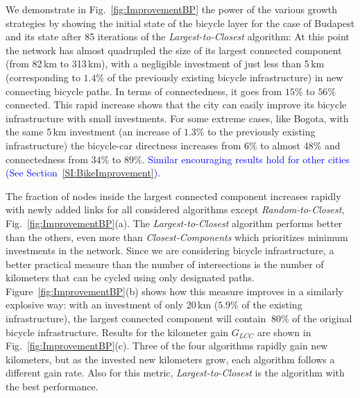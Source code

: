 We demonstrate in Fig.~\ref{fig:ImprovementBP} the power of the various growth strategies by showing the initial state of the bicycle layer for the case of Budapest and its state after 85 iterations of the \emph{Largest-to-Closest} algorithm: At this point the network has almost quadrupled the size of its largest connected component (from 82\,km to 313\,km), with a negligible investment of just less than 5\,km (corresponding to $1.4\%$ of the previously existing bicycle infrastructure) in new connecting bicycle paths. In terms of connectedness, it goes from $15\%$ to $56\%$ connected. This rapid increase shows that the city can easily improve its bicycle infrastructure with small investments. For some extreme cases, like Bogota, with the same 5\,km investment (an increase of $1.3\%$ to the previously existing infrastructure) the bicycle-car directness increases from $6\%$ to almost $48\%$ and connectedness from $34\%$ to $89\%$. \textcolor{blue}{Similar encouraging results hold for other cities (See Section~\ref{SI:BikeImprovement}).}%

The fraction of nodes inside the largest connected component increases rapidly with newly added links for all considered algorithms except \emph{Random-to-Closest}, Fig.~\ref{fig:ImprovementBP}(a). The \emph{Largest-to-Closest} algorithm performs better than the others, even more than \emph{Closest-Components} which prioritizes minimum investments in the network. Since we are considering bicycle infrastructure, a better practical measure than the number of intersections is the number of kilometers that can be cycled using only designated paths. Figure~\ref{fig:ImprovementBP}(b) shows how this measure improves in a similarly explosive way: with an investment of only 20\,km ($5.9\%$ of the existing infrastructure), the largest connected component will contain $~80\%$ of the original bicycle infrastructure. Results for the kilometer gain $G_{LCC}$ are shown in Fig.~\ref{fig:ImprovementBP}(c). Three of the four algorithms rapidly gain new kilometers, but as the invested new kilometers grow, each algorithm follows a different gain rate. Also for this metric, \textit{Largest-to-Closest} is the algorithm with the best performance.

